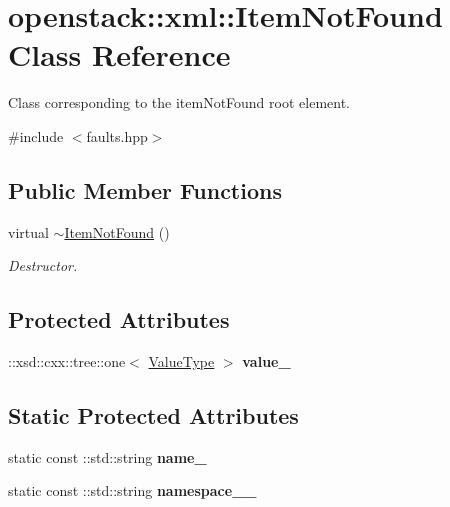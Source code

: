 \hypertarget{classopenstack_1_1xml_1_1ItemNotFound}{
\section{openstack::xml::ItemNotFound Class Reference}
\label{classopenstack_1_1xml_1_1ItemNotFound}
}


Class corresponding to the itemNotFound root element.  




{\ttfamily \#include $<$faults.hpp$>$}

\subsection*{Public Member Functions}
\begin{DoxyCompactItemize}
\item 
\hypertarget{classopenstack_1_1xml_1_1ItemNotFound_a1b12d73bc79dab0beae968c0f44ff722}{
virtual \hyperlink{classopenstack_1_1xml_1_1ItemNotFound_a1b12d73bc79dab0beae968c0f44ff722}{$\sim$ItemNotFound} ()}
\label{classopenstack_1_1xml_1_1ItemNotFound_a1b12d73bc79dab0beae968c0f44ff722}

\begin{DoxyCompactList}\small\item\em Destructor. \item\end{DoxyCompactList}\end{DoxyCompactItemize}
\subsection*{Protected Attributes}
\begin{DoxyCompactItemize}
\item 
\hypertarget{classopenstack_1_1xml_1_1ItemNotFound_a1e19b978a5887bdb855903d454584d5a}{
::xsd::cxx::tree::one$<$ \hyperlink{classopenstack_1_1xml_1_1ItemNotFoundAPIFault}{ValueType} $>$ {\bfseries value\_\-}}
\label{classopenstack_1_1xml_1_1ItemNotFound_a1e19b978a5887bdb855903d454584d5a}

\end{DoxyCompactItemize}
\subsection*{Static Protected Attributes}
\begin{DoxyCompactItemize}
\item 
\hypertarget{classopenstack_1_1xml_1_1ItemNotFound_a3055c905b8507db08451bad289d756df}{
static const ::std::string {\bfseries name\_\-}}
\label{classopenstack_1_1xml_1_1ItemNotFound_a3055c905b8507db08451bad289d756df}

\item 
\hypertarget{classopenstack_1_1xml_1_1ItemNotFound_aa183956a5c9c899f5e402fe5beee8649}{
static const ::std::string {\bfseries namespace\_\-\_\-}}
\label{classopenstack_1_1xml_1_1ItemNotFound_aa183956a5c9c899f5e402fe5beee8649}

\end{DoxyCompactItemize}
